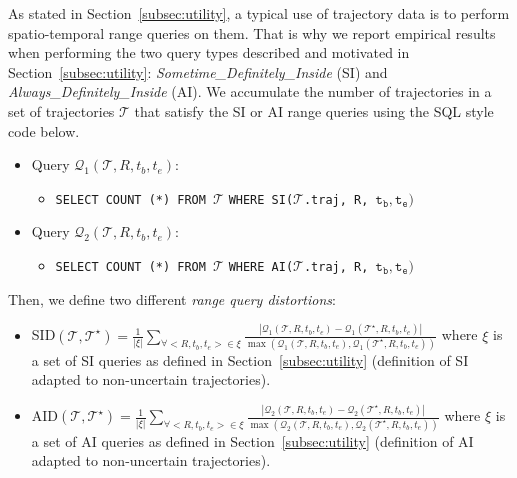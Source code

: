 As stated in Section~\ref{subsec:utility}, a typical use
of trajectory data is to perform spatio-temporal range
queries on them. That is why we report
empirical results when performing the two query types
described and motivated in Section~\ref{subsec:utility}:
\emph{Sometime\_Definitely\_Inside} (SI)
and \emph{Always\_Definitely\_Inside} (AI).
We accumulate the number of trajectories in a set of
trajectories $\mathcal{T}$
that satisfy the SI or AI range queries using
the  SQL style code below.

\begin{itemize}
    \item Query $\mathcal{Q}_1(\mathcal{T}, R, t_b, t_e)$:
    \begin{itemize}
        \item[] \texttt{SELECT COUNT (*) FROM }$\mathcal{T}$ \texttt{WHERE SI(}$\mathcal{T}$\texttt{.traj, R, }$\texttt{t}_{\texttt{b}}, \texttt{t}_{\texttt{e}})$
    \end{itemize}
    \item Query $\mathcal{Q}_2(\mathcal{T}, R, t_b, t_e)$:
    \begin{itemize}
        \item[] \texttt{SELECT COUNT (*) FROM }$\mathcal{T}$ \texttt{WHERE AI(}$\mathcal{T}$\texttt{.traj, R, }$\texttt{t}_{\texttt{b}}, \texttt{t}_{\texttt{e}})$
    \end{itemize}
\end{itemize}

Then, we define two different \emph{range query distortions}:

\begin{itemize}
    \item SID$(\mathcal{T}, \mathcal{T}^{\star}) =
    \frac{1}{|\xi|}\sum_{\forall <R, t_b, t_e> \in \xi}\frac{|\mathcal{Q}_1(\mathcal{T}, R, t_b, t_e)-\mathcal{Q}_1(\mathcal{T}^{\star}, R, t_b, t_e)|}{\max{(\mathcal{Q}_1(\mathcal{T}, R, t_b, t_e), \mathcal{Q}_1(\mathcal{T}^{\star}, R, t_b, t_e))}}$
where $\xi$ is a set of SI queries as defined in Section~\ref{subsec:utility}
(definition of SI adapted to non-uncertain trajectories).
    \item AID$(\mathcal{T}, \mathcal{T}^{\star}) =
    \frac{1}{|\xi|}\sum_{\forall <R, t_b, t_e> \in \xi}\frac{|\mathcal{Q}_2(\mathcal{T}, R, t_b, t_e)-\mathcal{Q}_2(\mathcal{T}^{\star}, R, t_b, t_e)|}{\max{(\mathcal{Q}_2(\mathcal{T}, R, t_b, t_e), \mathcal{Q}_2(\mathcal{T}^{\star}, R, t_b, t_e))}}$
where $\xi$ is a set of AI queries as defined in Section~\ref{subsec:utility}
(definition of AI adapted to non-uncertain trajectories).
\end{itemize}


